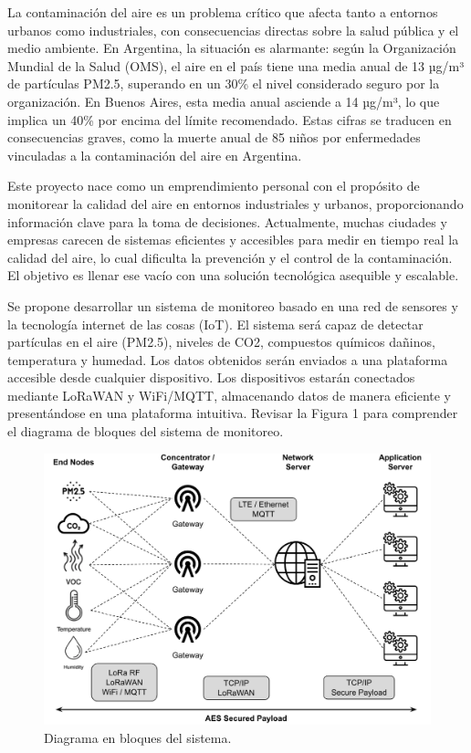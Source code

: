 \documentclass[
11pt, %
]{charter}
\begin{document}
La contaminación del aire es un problema crítico que afecta tanto a entornos urbanos como industriales, con consecuencias directas sobre la salud pública y el medio ambiente. En Argentina, la situación es alarmante: según la Organización Mundial de la Salud (OMS), el aire en el país tiene una media anual de 13 µg/m³ de partículas PM2.5, superando en un 30\% el nivel considerado seguro por la organización. En Buenos Aires, esta media anual asciende a 14 µg/m³, lo que implica un 40\% por encima del límite recomendado. Estas cifras se traducen en consecuencias graves, como la muerte anual de 85 niños por enfermedades vinculadas a la contaminación del aire en Argentina.

Este proyecto nace como un emprendimiento personal con el propósito de monitorear la calidad del aire en entornos industriales y urbanos, proporcionando información clave para la toma de decisiones. Actualmente, muchas ciudades y empresas carecen de sistemas eficientes y accesibles para medir en tiempo real la calidad del aire, lo cual dificulta la prevención y el control de la contaminación. El objetivo es llenar ese vacío con una solución tecnológica asequible y escalable.

Se propone desarrollar un sistema de monitoreo basado en una red de sensores y la tecnología internet de las cosas (IoT). El sistema será capaz de detectar partículas en el aire (PM2.5), niveles de CO2, compuestos químicos dañinos, temperatura y humedad. Los datos obtenidos serán enviados a una plataforma accesible desde cualquier dispositivo. Los dispositivos estarán conectados mediante LoRaWAN y WiFi/MQTT, almacenando datos de manera eficiente y presentándose en una plataforma intuitiva. Revisar la Figura 1 para comprender el diagrama de bloques del sistema de monitoreo.

\begin{figure}[htpb]
\centering 
\includegraphics[width=.65\textwidth]{./Figuras/fig_1-diagBloques.png}
\caption{Diagrama en bloques del sistema.}
\label{fig:diagBloques}
\end{figure}
\end{document}
